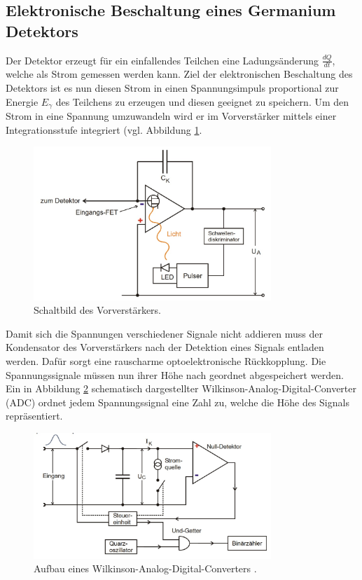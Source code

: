 \subsection{Elektronische Beschaltung eines Germanium Detektors}
\label{subsec:Elektronische Beschaltung eines Germanium Detektors}
Der Detektor erzeugt für ein einfallendes Teilchen eine Ladungsänderung $\frac{dQ}{dt}$, welche als Strom gemessen werden kann.
Ziel der elektronischen Beschaltung des Detektors ist es nun diesen Strom in einen Spannungsimpuls proportional zur Energie $E_\gamma$ des Teilchens zu erzeugen und diesen geeignet zu speichern.
Um den Strom in eine Spannung umzuwandeln wird er im Vorverstärker mittels einer Integrationsstufe integriert (vgl. Abbildung \ref{fig:t:1}.
\begin{figure}
\centering
\includegraphics[width=0.8\textwidth]{content/skizzen/aufbau2.jpg}
\caption{Schaltbild des Vorverstärkers.}
\label{fig:t:1}
\end{figure}
\cite{sample}
Damit sich die Spannungen verschiedener Signale nicht addieren muss der Kondensator des Vorverstärkers nach der Detektion eines Signals entladen werden. 
Dafür sorgt eine rauscharme optoelektronische Rückkopplung.
Die Spannungssignale müssen nun ihrer Höhe nach geordnet abgespeichert werden.
Ein in Abbildung \ref{fig:t:2} schematisch dargestellter Wilkinson-Analog-Digital-Converter (ADC) ordnet jedem Spannungssignal eine Zahl zu, welche die Höhe des Signals repräsentiert.
\begin{figure}
\centering
\includegraphics[width=0.8\textwidth]{content/skizzen/aufbau3.jpg}
\caption{Aufbau eines Wilkinson-Analog-Digital-Converters \cite{sample}.}
\label{fig:t:2}
\end{figure}
